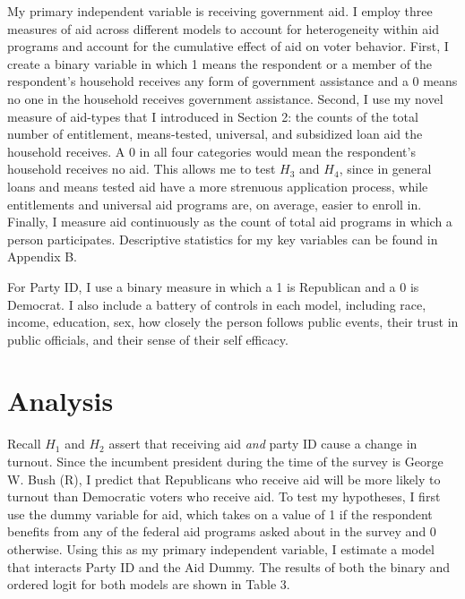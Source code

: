 \documentclass[12pt]{paper}
\begin{document}
My primary independent variable is receiving government aid. I employ three measures of aid across different models to account for heterogeneity within aid programs and account for the cumulative effect of aid on voter behavior. First, I create a binary variable in which 1 means the respondent or a member of the respondent’s household receives any form of government assistance and a 0 means no one in the household receives government assistance. Second, I use my novel measure of aid-types that I introduced in Section 2: the counts of the total number of entitlement, means-tested, universal, and subsidized loan aid the household receives. A 0 in all four categories would mean the respondent’s household receives no aid. This allows me to test $H_3$ and $H_4$, since in general loans and means tested aid have a more strenuous application process, while entitlements and universal aid programs are, on average, easier to enroll in. Finally, I measure aid continuously as the count of total aid programs in which a person participates. Descriptive statistics for my key variables can be found in Appendix B.

For Party ID, I use a binary measure in which a 1 is Republican and a 0 is Democrat. I also include a battery of controls in each model, including race, income, education, sex, how closely the person follows public events, their trust in public officials, and their sense of their self efficacy.

\section{Analysis}

Recall $H_1$ and $H_2$ assert that receiving aid \textit{and} party ID cause a change in turnout. Since the incumbent president during the time of the survey is George W. Bush (R), I predict that Republicans who receive aid will be more likely to turnout than Democratic voters who receive aid. To test my hypotheses, I first use the dummy variable for aid, which takes on a value of 1 if the respondent benefits from any of the federal aid programs asked about in the survey and 0 otherwise. Using this as my primary independent variable, I estimate a model that interacts Party ID and the Aid Dummy. The results of both the binary and ordered logit for both models are shown in Table 3.
\end{document}
